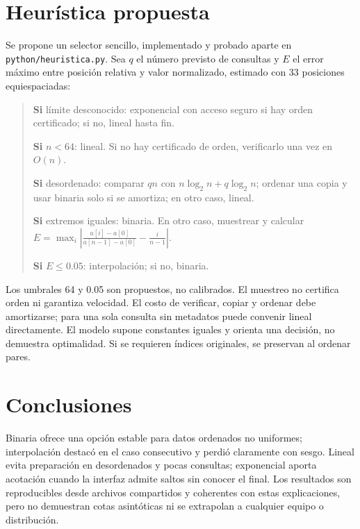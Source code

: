 \documentclass[10pt,a4paper]{article}
\begin{document}
\section{Heurística propuesta}
Se propone un selector sencillo, implementado y probado aparte en \texttt{python/heuristica.py}. Sea $q$ el número previsto de consultas y $E$ el error máximo entre posición relativa y valor normalizado, estimado con 33 posiciones equiespaciadas:
\begin{quote}\small
\textbf{Si} límite desconocido: exponencial con acceso seguro si hay orden certificado; si no, lineal hasta fin.\par
\textbf{Si} $n<64$: lineal. Si no hay certificado de orden, verificarlo una vez en $O(n)$.\par
\textbf{Si} desordenado: comparar $qn$ con $n\log_2n+q\log_2n$; ordenar una copia y usar binaria solo si se amortiza; en otro caso, lineal.\par
\textbf{Si} extremos iguales: binaria. En otro caso, muestrear y calcular
$E=\max_i\left|\frac{a[i]-a[0]}{a[n-1]-a[0]}-\frac{i}{n-1}\right|$.\par
\textbf{Si} $E\leq0.05$: interpolación; si no, binaria.
\end{quote}
Los umbrales 64 y 0.05 son propuestos, no calibrados. El muestreo no certifica orden ni garantiza velocidad. El costo de verificar, copiar y ordenar debe amortizarse; para una sola consulta sin metadatos puede convenir lineal directamente. El modelo supone constantes iguales y orienta una decisión, no demuestra optimalidad. Si se requieren índices originales, se preservan al ordenar pares.
\section{Conclusiones}
Binaria ofrece una opción estable para datos ordenados no uniformes; interpolación destacó en el caso consecutivo y perdió claramente con sesgo. Lineal evita preparación en desordenados y pocas consultas; exponencial aporta acotación cuando la interfaz admite saltos sin conocer el final. Los resultados son reproducibles desde archivos compartidos y coherentes con estas explicaciones, pero no demuestran cotas asintóticas ni se extrapolan a cualquier equipo o distribución.
\clearpage
\end{document}
